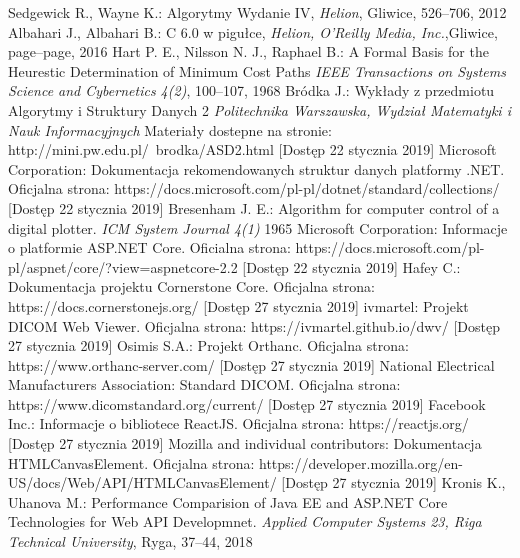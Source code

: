 \documentclass[a4paper,11pt,twoside,openright]{report}
\theoremstyle{definition}
\begin{document}
\begin{thebibliography}{20}
 Sedgewick R., Wayne K.: Algorytmy Wydanie IV, \emph{Helion}, Gliwice, 526--706, 2012
 Albahari J., Albahari B.: C 6.0 w pigułce, \emph{Helion, O'Reilly Media, Inc.},Gliwice, page--page, 2016
 Hart P. E., Nilsson N. J., Raphael B.: A Formal Basis for the Heurestic Determination of Minimum Cost Paths \emph{IEEE Transactions on Systems Science and Cybernetics 4(2)}, 100--107, 1968
 Bródka J.: Wykłady z przedmiotu Algorytmy i Struktury Danych 2 \emph{Politechnika Warszawska, Wydział Matematyki i Nauk Informacyjnych} Materiały dostepne na stronie: http://mini.pw.edu.pl/~brodka/ASD2.html [Dostęp 22 stycznia 2019]
 Microsoft Corporation: Dokumentacja rekomendowanych struktur danych platformy .NET. Oficjalna strona: https://docs.microsoft.com/pl-pl/dotnet/standard/collections/ [Dostęp 22 stycznia 2019]
 Bresenham J. E.: Algorithm for computer control of a digital plotter. \emph{ICM System Journal 4(1)} 1965
 Microsoft Corporation: Informacje o platformie ASP.NET Core. Oficialna strona: https://docs.microsoft.com/pl-pl/aspnet/core/?view=aspnetcore-2.2 [Dostęp 22 stycznia 2019]
  Hafey C.: Dokumentacja projektu Cornerstone Core. Oficjalna strona: https://docs.cornerstonejs.org/ [Dostęp 27 stycznia 2019]
  ivmartel: Projekt DICOM Web Viewer. Oficjalna strona: https://ivmartel.github.io/dwv/ [Dostęp 27 stycznia 2019]
  Osimis S.A.: Projekt Orthanc. Oficjalna strona: https://www.orthanc-server.com/ [Dostęp 27 stycznia 2019]
  National Electrical Manufacturers Association: Standard DICOM. Oficjalna strona: https://www.dicomstandard.org/current/ [Dostęp 27 stycznia 2019]
 Facebook Inc.: Informacje o bibliotece ReactJS. Oficjalna strona: https://reactjs.org/ [Dostęp 27 stycznia 2019]
 Mozilla and individual contributors: Dokumentacja HTMLCanvasElement. Oficjalna strona: https://developer.mozilla.org/en-US/docs/Web/API/HTMLCanvasElement/ [Dostęp 27 stycznia 2019]
 Kronis K., Uhanova M.: Performance Comparision of Java EE and ASP.NET Core Technologies for Web API Developmnet. \emph{Applied Computer Systems 23, Riga Technical University}, Ryga, 37--44, 2018

\end{thebibliography}
\end{document}

